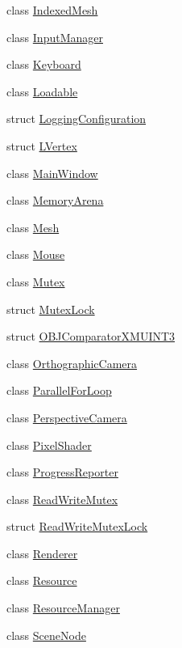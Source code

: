\begin{DoxyCompactItemize}
class \hyperlink{classmage_1_1_indexed_mesh}{Indexed\+Mesh}
\item 
class \hyperlink{classmage_1_1_input_manager}{Input\+Manager}
\item 
class \hyperlink{classmage_1_1_keyboard}{Keyboard}
\item 
class \hyperlink{classmage_1_1_loadable}{Loadable}
\item 
struct \hyperlink{structmage_1_1_logging_configuration}{Logging\+Configuration}
\item 
struct \hyperlink{structmage_1_1_l_vertex}{L\+Vertex}
\item 
class \hyperlink{classmage_1_1_main_window}{Main\+Window}
\item 
class \hyperlink{classmage_1_1_memory_arena}{Memory\+Arena}
\item 
class \hyperlink{classmage_1_1_mesh}{Mesh}
\item 
class \hyperlink{classmage_1_1_mouse}{Mouse}
\item 
class \hyperlink{classmage_1_1_mutex}{Mutex}
\item 
struct \hyperlink{structmage_1_1_mutex_lock}{Mutex\+Lock}
\item 
struct \hyperlink{structmage_1_1_o_b_j_comparator_x_m_u_i_n_t3}{O\+B\+J\+Comparator\+X\+M\+U\+I\+N\+T3}
\item 
class \hyperlink{classmage_1_1_orthographic_camera}{Orthographic\+Camera}
\item 
class \hyperlink{classmage_1_1_parallel_for_loop}{Parallel\+For\+Loop}
\item 
class \hyperlink{classmage_1_1_perspective_camera}{Perspective\+Camera}
\item 
class \hyperlink{classmage_1_1_pixel_shader}{Pixel\+Shader}
\item 
class \hyperlink{classmage_1_1_progress_reporter}{Progress\+Reporter}
\item 
class \hyperlink{classmage_1_1_read_write_mutex}{Read\+Write\+Mutex}
\item 
struct \hyperlink{structmage_1_1_read_write_mutex_lock}{Read\+Write\+Mutex\+Lock}
\item 
class \hyperlink{classmage_1_1_renderer}{Renderer}
\item 
class \hyperlink{classmage_1_1_resource}{Resource}
\item 
class \hyperlink{classmage_1_1_resource_manager}{Resource\+Manager}
\item 
class \hyperlink{classmage_1_1_scene_node}{Scene\+Node}
\item 

\end{DoxyCompactItemize}
